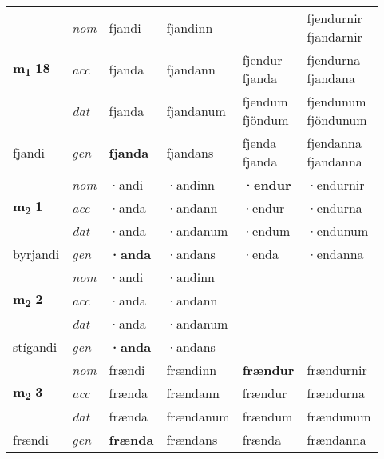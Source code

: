 \begin{longtable}[l]{X>{\footnotesize\itshape}XXXXX}
\multirow{3}{*}{{{\textbf{m{\textsubscript{1}}} \Large{\textbf{18}}}}}  
 & nom & fjandi & fjandinn    & \textbf{\specialcell{fjendur\\ fjandar}} & \specialcell{fjendurnir\\ fjandarnir}  \\*
 & acc & fjanda  & fjandann   & \specialcell{fjendur\\ fjanda}  & \specialcell{fjendurna\\ fjandana} \\*
 & dat & fjanda & fjandanum   & \specialcell{fjendum\\ fjöndum} & \specialcell{fjendunum\\ fjöndunum} \\*
 {\footnotesize{fjandi}} &  gen & \textbf{fjanda}  & fjandans  & \specialcell{fjenda\\ fjanda} & \specialcell{fjendanna\\ fjandanna} \\
\cmidrule{1-6}


\multirow{3}{*}{{{\textbf{m{\textsubscript{2}}} \Large{\textbf{1}}}}}  
 & nom & ·andi & ·andinn    & \textbf{·endur} & ·endurnir  \\*
 & acc & ·anda  & ·andann   & ·endur  & ·endurna \\*
 & dat & ·anda & ·andanum   & ·endum & ·endunum \\*
 {\footnotesize{byrjandi}} &  gen & \textbf{·anda}  & ·andans  & ·enda & ·endanna \\
\cmidrule{1-6}


\multirow{3}{*}{{{\textbf{m{\textsubscript{2}}} \Large{\textbf{2}}}}}  
 & nom & ·andi & ·andinn    & \textbf{} &   \\*
 & acc & ·anda  & ·andann   &   &  \\*
 & dat & ·anda & ·andanum   &  &  \\*
 {\footnotesize{stígandi}} &  gen & \textbf{·anda}  & ·andans  &  &  \\
\cmidrule{1-6}


\multirow{3}{*}{{{\textbf{m{\textsubscript{2}}} \Large{\textbf{3}}}}}  
 & nom & frændi & frændinn    & \textbf{frændur} & frændurnir  \\*
 & acc & frænda  & frændann   & frændur  & frændurna \\*
 & dat & frænda & frændanum   & frændum & frændunum \\*
 {\footnotesize{frændi}} &  gen & \textbf{frænda}  & frændans  & frænda & frændanna \\
\cmidrule{1-6}



\end{longtable}

